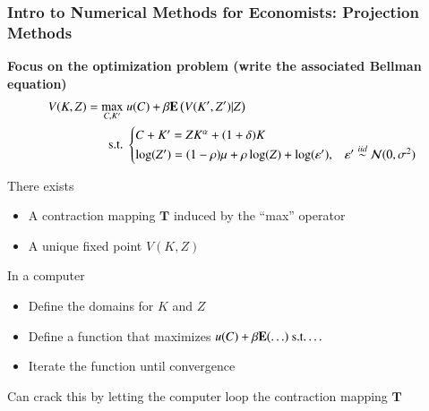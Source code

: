 \documentclass[10pt, aspectratio=1610, handout]{beamer}
\begin{document}
  \begin{frame}
    \frametitle{Intro to Numerical Methods for Economists: Projection Methods}

    \textbf{Focus on the optimization problem (write the associated Bellman equation)}
    \begin{align*}
      V(K, Z) = \max_{C, K'} &\; u(C) + \beta \E \left( V(K', Z') | Z \right) \\
      \text{s.t.} &\; \begin{cases}
        C + K' = Z K^\alpha + (1 + \delta) K \\
        \log(Z') = (1-\rho) \mu + \rho \log(Z) + \log(\varepsilon'), & \varepsilon' \overset{iid}{\sim} \mathcal{N}(0, \sigma^2) %
      \end{cases}
    \end{align*}

    \vfill\pause

    There exists
    \begin{itemize}
      \item A contraction mapping $\mathbf{T}$ induced by the ``max'' operator
      \item A unique fixed point $V(K, Z)$
    \end{itemize}

    \vfill\pause

    In a computer
    \begin{itemize}
      \item Define the domains for $K$ and $Z$
      \item Define a function that maximizes $u(C) + \beta \mathbf{E} (\ldots) \text{ s.t.} \ldots$
      \item Iterate the function until convergence
    \end{itemize}

    \vfill\pause

    Can crack this by letting the computer loop the contraction mapping $\mathbf{T}$

  \end{frame}
\end{document}
